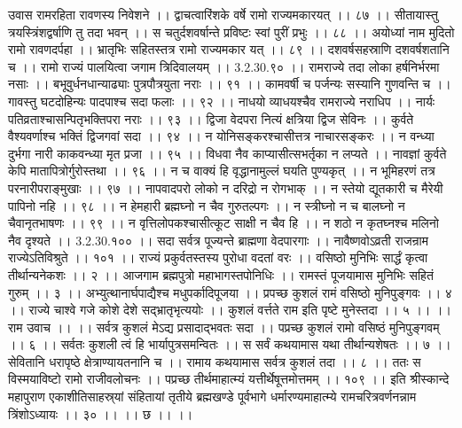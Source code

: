 उवास रामरहिता रावणस्य निवेशने ।।
द्वाचत्वारिंशके वर्षे रामो राज्यमकारयत् ।। ८७ ।।
सीतायास्तु त्रयस्त्रिंशद्वर्षाणि तु तदा भवन् ।।
स चतुर्दशवर्षान्ते प्रविष्टः स्वां पुरीं प्रभुः ।। ८८ ।।
अयोध्यां नाम मुदितो रामो रावणदर्पहा ।।
भ्रातृभिः सहितस्तत्र रामो राज्यमकार यत् ।। ८९ ।।
दशवर्षसहस्राणि दशवर्षशतानि च ।।
रामो राज्यं पालयित्वा जगाम त्रिदिवालयम् ।। 3.2.30.९० ।।
रामराज्ये तदा लोका हर्षनिर्भरमा नसाः ।।
बभूवुर्धनधान्याढ्याः पुत्रपौत्रयुता नराः ।। ९१ ।।
कामवर्षी च पर्जन्यः सस्यानि गुणवन्ति च ।।
गावस्तु घटदोहिन्यः पादपाश्च सदा फलाः ।। ९२ ।।
नाधयो व्याधयश्चैव रामराज्ये नराधिप ।।
नार्यः पतिव्रताश्चासन्पितृभक्तिपरा नराः ।। ९३ ।।
द्विजा वेदपरा नित्यं क्षत्रिया द्विज सेविनः ।।
कुर्वते वैश्यवर्णाश्च भक्तिं द्विजगवां सदा ।। ९४ ।।
न योनिसङ्करश्चासीत्तत्र नाचारसङ्करः ।।
न वन्ध्या दुर्भगा नारी काकवन्ध्या मृत प्रजा ।। ९५ ।।
विधवा नैव काप्यासीत्सभर्तृका न लप्यते ।।
नावज्ञां कुर्वते केपि मातापित्रोर्गुरोस्तथा ।। ९६ ।।
न च वाक्यं हि वृद्धानामुल्लं घयति पुण्यकृत् ।।
न भूमिहरणं तत्र परनारीपराङ्मुखाः ।। ९७ ।।
नापवादपरो लोको न दरिद्रो न रोगभाक् ।।
न स्तेयो द्यूतकारी च मैरेयी पापिनो नहि ।। ९८ ।।
न हेमहारी ब्रह्मघ्नो न चैव गुरुतल्पगः ।।
न स्त्रीघ्नो न च बालघ्नो न चैवानृतभाषणः ।। ९९ ।।
न वृत्तिलोपकश्चासीत्कूट साक्षी न चैव हि ।।
न शठो न कृतघ्नश्च मलिनो नैव दृश्यते ।। 3.2.30.१०० ।।
सदा सर्वत्र पूज्यन्ते ब्राह्मणा वेदपारगाः ।।
नावैष्णवोऽव्रती राजन्राम राज्येऽतिविश्रुते ।। १०१ ।।
राज्यं प्रकुर्वतस्तस्य पुरोधा वदतां वरः ।।
वसिष्ठो मुनिभिः सार्द्धं कृत्वा तीर्थान्यनेकशः ।। २ ।।
आजगाम ब्रह्मपुत्रो महाभागस्तपोनिधिः ।।
रामस्तं पूजयामास मुनिभिः सहितं गुरुम् ।। ३ ।।
अभ्युत्थानार्घपाद्यैश्च मधुपर्कादिपूजया ।।
प्रपच्छ कुशलं रामं वसिष्ठो मुनिपुङ्गवः ।। ४ ।।
राज्ये चाश्वे गजे कोशे देशे सद्भ्रातृभृत्ययोः ।।
कुशलं वर्त्तते राम इति पृष्टे मुनेस्तदा ।। ५ ।।
।। राम उवाच ।। ।।
सर्वत्र कुशलं मेऽद्य प्रसादाद्भवतः सदा ।।
पप्रच्छ कुशलं रामो वसिष्ठं मुनिपुङ्गवम् ।। ६ ।।
सर्वतः कुशली त्वं हि भार्यापुत्रसमन्वितः ।।
स सर्वं कथयामास यथा तीर्थान्यशेषतः ।। ७ ।।
सेवितानि धरापृष्ठे क्षेत्राण्यायतनानि च ।।
रामाय कथयामास सर्वत्र कुशलं तदा ।। ८ ।।
ततः स विस्मयाविष्टो रामो राजीवलोचनः ।।
पप्रच्छ तीर्थमाहात्म्यं यत्तीर्थेषूत्तमोत्तमम् ।। १०९ ।।
इति श्रीस्कान्दे महापुराण एकाशीतिसाहस्र्यां संहितायां तृतीये ब्रह्मखण्डे पूर्वभागे धर्मारण्यमाहात्म्ये रामचरित्रवर्णनन्नाम त्रिंशोऽध्यायः ।। ३० ।। ।। छ ।। ।।


